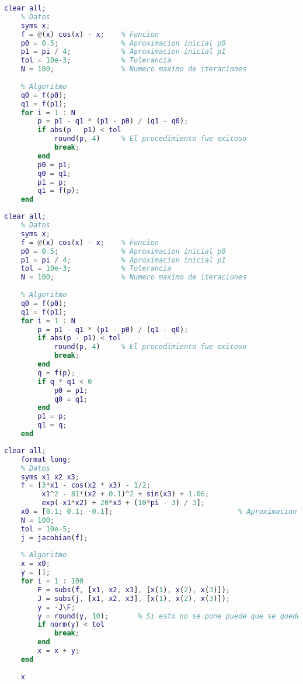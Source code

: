 \begin{lstlisting}[caption={Método de la Secante}, language = Matlab, label = {cod: Método de la Secante}]
    clear all;
    % Datos
    syms x;
    f = @(x) cos(x) - x;    % Funcion
    p0 = 0.5;               % Aproximacion inicial p0
    p1 = pi / 4;            % Aproximacion inicial p1
    tol = 10e-3;            % Tolerancia
    N = 100;                % Numero maximo de iteraciones
    
    % Algoritmo
    q0 = f(p0);
    q1 = f(p1);
    for i = 1 : N
        p = p1 - q1 * (p1 - p0) / (q1 - q0);
        if abs(p - p1) < tol
            round(p, 4)     % El procedimiento fue exitoso
            break;
        end
        p0 = p1;
        q0 = q1;
        p1 = p;
        q1 = f(p);
    end
\end{lstlisting}

\begin{lstlisting}[caption={Método de la Posición Falsa}, language = Matlab, label = {cod: Método de la Posición Falsa}]
    clear all;
    % Datos
    syms x;
    f = @(x) cos(x) - x;    % Funcion
    p0 = 0.5;               % Aproximacion inicial p0
    p1 = pi / 4;            % Aproximacion inicial p1
    tol = 10e-3;            % Tolerancia
    N = 100;                % Numero maximo de iteraciones
    
    % Algoritmo
    q0 = f(p0);
    q1 = f(p1);
    for i = 1 : N
        p = p1 - q1 * (p1 - p0) / (q1 - q0);
        if abs(p - p1) < tol
            round(p, 4)     % El procedimiento fue exitoso
            break;
        end
        q = f(p);
        if q * q1 < 0
            p0 = p1;
            q0 = q1;
        end
        p1 = p;
        q1 = q;
    end
\end{lstlisting}

\begin{lstlisting}[caption={Método de Newton para Sistemas}, language = Matlab, label = {cod: Método de Newton para Sistemas}]
    clear all;
    format long;
    % Datos
    syms x1 x2 x3;
    f = [3*x1 - cos(x2 * x3) - 1/2;
         x1^2 - 81*(x2 + 0.1)^2 + sin(x3) + 1.06;
         exp(-x1*x2) + 20*x3 + (10*pi - 3) / 3];
    x0 = [0.1; 0.1; -0.1];                              % Aproximacion inicial
    N = 100;
    tol = 10e-5;
    j = jacobian(f);
    
    % Algoritmo
    x = x0;
    y = [];
    for i = 1 : 100
        F = subs(f, [x1, x2, x3], [x(1), x(2), x(3)]);
        J = subs(j, [x1, x2, x3], [x(1), x(2), x(3)]);
        y = -J\F;
        y = round(y, 10);       % Si esto no se pone puede que se quede colgado el bucle
        if norm(y) < tol
            break;
        end
        x = x + y;
    end
    
    x
\end{lstlisting}

